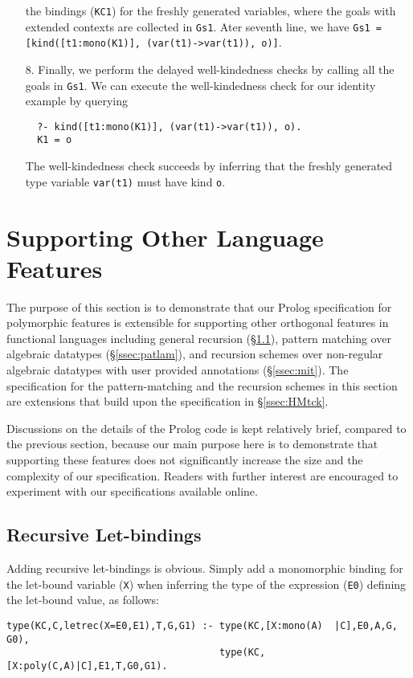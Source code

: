 \documentclass[runningheads,a4paper]{llncs}
\begin{document}
\begin{itemize}
the bindings (\verb|KC1|) for the freshly generated variables, 
where the goals with extended contexts are collected in \verb|Gs1|.
Ater seventh line, we have 
\verb|Gs1 = [kind([t1:mono(K1)], (var(t1)->var(t1)), o)]|.
\item[8.] Finally, we perform the delayed well-kindedness checks by calling
all the goals in \verb|Gs1|. We can execute the well-kindedness check for
our identity example by querying
\begin{verbatim}
  ?- kind([t1:mono(K1)], (var(t1)->var(t1)), o).
  K1 = o
\end{verbatim}
The well-kindedness check succeeds by inferring that the freshly generated
type variable \verb|var(t1)| must have kind \verb|o|.
\end{itemize}

\section{Supporting Other Language Features}\label{sec:other}
The purpose of this section is to demonstrate that our Prolog specification
for polymorphic features is extensible for supporting other orthogonal
features in functional languages including general recursion
(\S\ref{ssec:letrec}), pattern matching over algebraic datatypes
(\S\ref{ssec:patlam}), and recursion schemes over non-regular
algebraic datatypes with user provided annotations (\S\ref{ssec:mit}).
The specification for the pattern-matching and the recursion schemes
in this section are extensions that build upon the specification
in \S\ref{ssec:HMtck}.

Discussions on the details of the Prolog code is kept relatively brief,
compared to the previous section, because our main purpose here is to
demonstrate that supporting these features does not significantly increase
the size and the complexity of our specification. Readers with further
interest are encouraged to experiment with our specifications available
online.

\subsection{Recursive Let-bindings}\label{ssec:letrec}
Adding recursive let-bindings is obvious. Simply add
a monomorphic binding for the let-bound variable (\verb|X|)
when inferring the type of the expression (\verb|E0|) defining
the let-bound value, as follows:
{\small
\begin{verbatim}
type(KC,C,letrec(X=E0,E1),T,G,G1) :- type(KC,[X:mono(A)  |C],E0,A,G, G0),
                                     type(KC,[X:poly(C,A)|C],E1,T,G0,G1).
\end{verbatim} }
\end{document}

